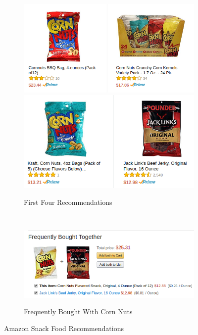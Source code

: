 \documentclass[11pt]{article}
\begin{document}
\begin{figure}[H]
    \centering
    \begin{subfigure}[t]{0.5\textwidth}
        \centering
    \includegraphics[scale=.6]{amazon_recp1.png}
     \includegraphics[scale=.6]{amazon_recp2.png}
          \caption{First Four Recommendations}
         \label{fig:q2_arec_ff}
    \end{subfigure}%
    ~ 
    \begin{subfigure}[t]{0.5\textwidth}
        \centering
{\includegraphics[scale=.7]{amazonCornFeq.png}}
        \caption{Frequently Bought With Corn Nuts}
          \label{fig:q2_arec_bt}
    \end{subfigure}
       \caption{Amazon Snack Food Recommendations}
    \label{fig:q2_arec}
\end{figure}
\end{document}
